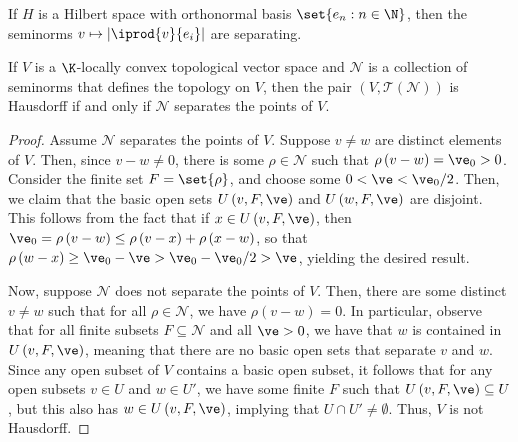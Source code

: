 \documentclass[10pt]{mypackage}
\begin{document}
\begin{example}
  If $ H $ is a Hilbert space with orthonormal basis $\set{e_n : n\in \N}$, then the seminorms $ v\mapsto \left\vert \iprod{v}{e_i} \right\vert $ are separating.
\end{example}
\begin{theorem}
  If $V$ is a $\K$-locally convex topological vector space and $ \mathcal{N} $ is a collection of seminorms that defines the topology on $V$, then the pair $ \left( V,\mathcal{T}\left( \mathcal{N} \right) \right) $ is Hausdorff if and only if $ \mathcal{N} $ separates the points of $V$.
\end{theorem}
\begin{proof}
  Assume $\mathcal{N}$ separates the points of $V$. Suppose $v\neq w$ are distinct elements of $V$. Then, since $v-w\neq 0$, there is some $\rho\in \mathcal{N}$ such that $\rho\left( v-w \right) = \ve_0 > 0$. Consider the finite set $F = \set{\rho}$, and choose some $0 < \ve < \ve_0/2$. Then, we claim that the basic open sets $U\left( v,F,\ve \right)$ and $U\left( w,F,\ve \right)$ are disjoint. This follows from the fact that if $x\in U\left( v,F,\ve \right)$, then $\ve_0 = \rho\left( v-w \right)\leq \rho\left( v-x \right) + \rho\left( x-w \right)$, so that $\rho\left( w-x \right) \geq \ve_0 - \ve > \ve_0 - \ve_0/2 > \ve$, yielding the desired result.

  Now, suppose $ \mathcal{N} $ does not separate the points of $V$. Then, there are some distinct $v\neq w$ such that for all $\rho\in \mathcal{N}$, we have $\rho\left( v-w \right) = 0$. In particular, observe that for all finite subsets $F\subseteq \mathcal{N}$ and all $\ve > 0$, we have that $w$ is contained in $U\left( v,F,\ve \right)$, meaning that there are no basic open sets that separate $v$ and $w$. Since any open subset of $V$ contains a basic open subset, it follows that for any open subsets $v\in U$ and $w\in U'$, we have some finite $F$ such that $U\left( v,F,\ve \right)\subseteq U$, but this also has $w\in U\left( v,F,\ve \right)$, implying that $U\cap U'\neq \emptyset$. Thus, $ V $ is not Hausdorff.
\end{proof}
\end{document}
